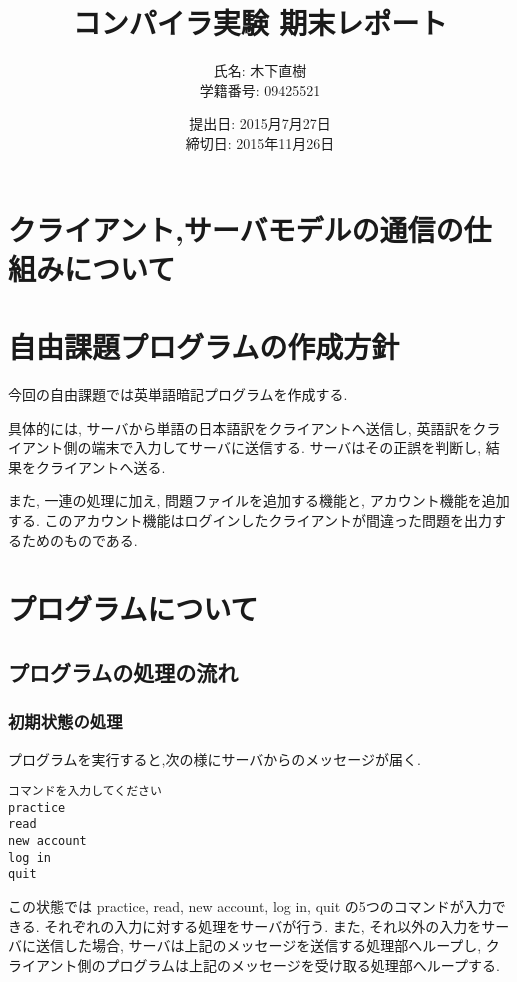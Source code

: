 \documentclass[a4j]{jarticle}
\title{コンパイラ実験 期末レポート}
\author{氏名: 木下直樹\\学籍番号: 09425521}
\date{提出日: 2015月7月27日\\締切日: 2015年11月26日}
\begin{document}
\maketitle

\section{クライアント,サーバモデルの通信の仕組みについて}

\section{自由課題プログラムの作成方針}
今回の自由課題では英単語暗記プログラムを作成する.

具体的には, サーバから単語の日本語訳をクライアントへ送信し, 英語訳をクライアント側の端末で入力してサーバに送信する. サーバはその正誤を判断し, 結果をクライアントへ送る.

また, 一連の処理に加え, 問題ファイルを追加する機能と, アカウント機能を追加する. 
このアカウント機能はログインしたクライアントが間違った問題を出力するためのものである.


\section{プログラムについて}
\subsection{プログラムの処理の流れ}
\subsubsection{初期状態の処理}
プログラムを実行すると,次の様にサーバからのメッセージが届く.
\begin{verbatim}
コマンドを入力してください
practice
read
new account
log in
quit
\end{verbatim}
この状態では practice, read, new account, log in, quit の5つのコマンドが入力できる.
それぞれの入力に対する処理をサーバが行う.
また, それ以外の入力をサーバに送信した場合, サーバは上記のメッセージを送信する処理部へループし, クライアント側のプログラムは上記のメッセージを受け取る処理部へループする.
\end{document}
